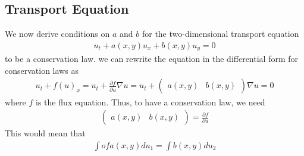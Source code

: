 \subsection{Transport Equation}
We now derive conditions on $a$ and $b$ for the two-dimensional transport equation 
\begin{align*}
u_t + a(x,y)u_x + b(x,y) u_y = 0
\end{align*} to be a conservation law. 
we can rewrite the equation in the differential form for conservation laws as 
\begin{align*}
u_t + f(u)_x = u_t + \frac{\partial f}{\partial u} \nabla u =  u_t + \begin{pmatrix}
a(x,y) & b(x,y)
\end{pmatrix} \nabla u = 0
\end{align*}
where $f$ is the flux equation. Thus, to have a conservation law, we need
\begin{align*}
\begin{pmatrix}
a(x,y) & b(x,y)
\end{pmatrix} = \frac{\partial f}{\partial u}
\end{align*}
This would mean that 
\begin{align*}
\int of a(x,y) du_1 = \int b(x,y) du_2
\end{align*}
